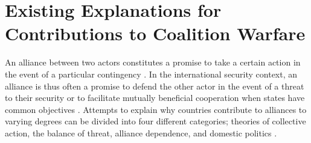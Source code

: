 \documentclass[12pt,letterpaper]{article}
\begin{document}
\section{Existing Explanations for Contributions to Coalition Warfare}
	An alliance between two actors constitutes a promise to take a certain action in the event of a particular contingency \citep{altfeld_decisionallytheory_1984}. In the international security context, an alliance is thus often a promise to defend the other actor in the event of a threat to their security \citep{waltz_theoryinternationalpolitics_1979, walt_originsalliance_1987} or to facilitate mutually beneficial cooperation when states have common objectives \citep{keohane_hegemonycooperationdiscord_1984, wolford_showing_2014}. Attempts to explain why countries contribute to alliances to varying degrees can be divided into four different categories; theories of collective action, the balance of threat, alliance dependence, and domestic politics \citep{bennett_burdensharingpersiangulf_1994, haesebrouck_democraticparticipationair_2016}.
	
\end{document}
